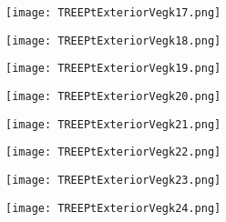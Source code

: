\documentclass[pdf]{beamer}
\begin{document}
\begin{frame}
\begin{figure}[!h]
\centering
\texttt{[image: TREEPtExteriorVegk17.png]}
\end{figure}
\end{frame}

\begin{frame}
\begin{figure}[!h]
\centering
\texttt{[image: TREEPtExteriorVegk18.png]}
\end{figure}
\end{frame}

\begin{frame}
\begin{figure}[!h]
\centering
\texttt{[image: TREEPtExteriorVegk19.png]}
\end{figure}
\end{frame}

\begin{frame}
\begin{figure}[!h]
\centering
\texttt{[image: TREEPtExteriorVegk20.png]}
\end{figure}
\end{frame}

\begin{frame}
\begin{figure}[!h]
\centering
\texttt{[image: TREEPtExteriorVegk21.png]}
\end{figure}
\end{frame}

\begin{frame}
\begin{figure}[!h]
\centering
\texttt{[image: TREEPtExteriorVegk22.png]}
\end{figure}
\end{frame}

\begin{frame}
\begin{figure}[!h]
\centering
\texttt{[image: TREEPtExteriorVegk23.png]}
\end{figure}
\end{frame}

\begin{frame}
\begin{figure}[!h]
\centering
\texttt{[image: TREEPtExteriorVegk24.png]}
\end{figure}
\end{frame}
\end{document}
